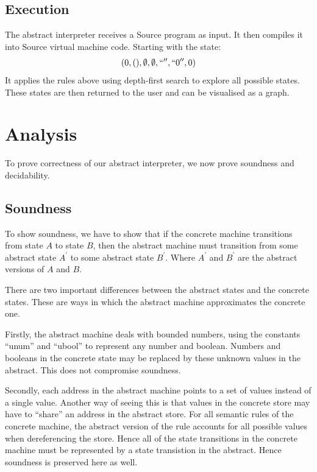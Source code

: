 \documentclass[12pt]{article}
\begin{document}
\subsection{Execution}
The abstract interpreter receives a Source program as input. It then compiles it into Source virtual machine code. Starting with the state:
$$(0,(),\emptyset,\emptyset,``'',``0'',0)$$
It applies the rules above using depth-first search to explore all possible states. These states are then returned to the user and can be visualised as a graph.

\section{Analysis}
To prove correctness of our abstract interpreter, we now prove soundness and decidability.

\subsection{Soundness}
To show soundness, we have to show that if the concrete machine transitions from state $A$ to state $B$, then the abstract machine must transition from some abstract state $A^{\prime}$ to some abstract state $B^{\prime}$. Where $A^{\prime}$ and $B^{\prime}$ are the abstract versions of $A$ and $B$.

There are two important differences between the abstract states and the concrete states. These are ways in which the abstract machine approximates the concrete one.

Firstly, the abstract machine deals with bounded numbers, using the constants ``unum'' and ``ubool'' to represent any number and boolean. Numbers and booleans in the concrete state may be replaced by these unknown values in the abstract. This does not compromise soundness.

Secondly, each address in the abstract machine points to a set of values instead of a single value. Another way of seeing this is that values in the concrete store may have to ``share'' an address in the abstract store. For all semantic rules of the concrete machine, the abstract version of the rule accounts for all possible values when dereferencing the store. Hence all of the state transitions in the concrete machine must be represented by a state transistion in the abstract. Hence soundness is preserved here as well.
\end{document}
